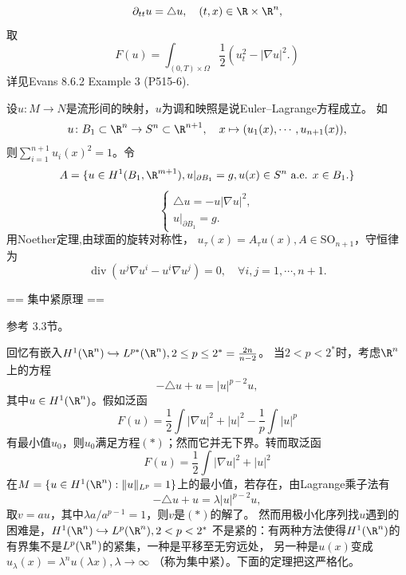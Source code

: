 \begin{example}
    \[\partial_{tt}u=\triangle u,\quad(t,x)\in\R\times\R^n,\]
    取
    \[F(u)=\int_{(0,T)\times\Omega}\frac{1}{2}(u_t^2-|\nabla u|^2.)\]
    详见Evans 8.6.2 Example 3 (P515-6).
\end{example}

\begin{example}[调和映照]
    设$u\colon M\to N$是流形间的映射，$u$为调和映照是说Euler--Lagrange方程成立。
    如\[u\colon B_1\subset\R^n \to S^n\subset\R^{n+1},
    \quad x\mapsto(u_1(x),\cdots,u_{n+1}(x)),\]
    则$\sum\limits_{i=1}^{n+1}u_i(x)^2=1$。令
    \[A=\{u\in H^1(B_1,\R^{m+1}),u|_{\partial B_1}=g,
    u(x)\in S^n\text{ a.e. }x\in B_1.\}\]
    \[\begin{cases}\triangle u=-u|\nabla u|^2,\\u|_{\partial B_1}=g.\end{cases}\]
    用Noether定理,由球面的旋转对称性，
    $u_\tau(x)=A_\tau u(x),A\in\mathrm{SO}_{n+1}$，守恒律为
    \[\operatorname{div}(u^j\nabla u^i-u^i\nabla u^j)=0,
    \quad \forall i,j=1,\cdots,n+1.\]
\end{example}

== 集中紧原理 ==

参考\cite{Liu} 3.3节。

回忆有嵌入$H^1(\R^n)\hookrightarrow L^{p*}(\R^n),2\le p\le 2^*=\frac{2n}{n-2}$。
当$2<p<2^*$时，考虑$\R^n$上的方程
\[-\triangle u+u=|u|^{p-2}u,\tag{$*$}\]
其中$u\in H^1(\R^n)$。假如泛函
\[F(u)=\frac{1}{2}\int|\nabla u|^2+|u|^2-\frac{1}{p}\int|u|^p\]
有最小值$u_0$，则$u_0$满足方程$(*)$；然而它并无下界。转而取泛函
\[F(u)=\frac{1}{2}\int|\nabla u|^2+|u|^2\]
在$M=\{u\in H^1(\R^n):\|u\|_{L^p}=1\}$上的最小值，若存在，由Lagrange乘子法有
\[-\triangle u+u=\lambda|u|^{p-2}u,\]
取$v=au$，其中$\lambda a/a^{p-1}=1$，则$v$是$(*)$的解了。
然而用极小化序列找$u$遇到的困难是，$H^1(\R^n)\hookrightarrow L^p(\R^n),2<p<2^*$
不是紧的：有两种方法使得$H^1(\R^n)$的有界集不是$L^p(\R^n)$的紧集，一种是平移至无穷远处，
另一种是$u(x)$变成$u_\lambda(x)=\lambda^n u(\lambda x),\lambda\to\infty$
（称为集中紧）。下面的定理把这严格化。

